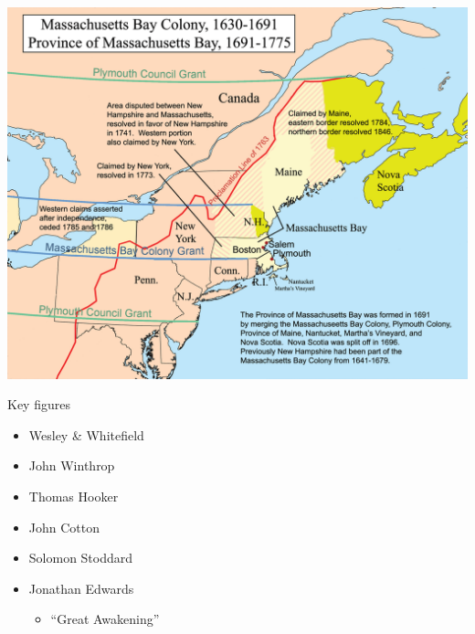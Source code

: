 \begin{frame}[label=sec-2-8]{}
\includegraphics[width=.9\linewidth]{./img/Masscolony.png}
\end{frame}

\begin{frame}[label=sec-2-9]{Key figures}
\begin{itemize}
\item Wesley \& Whitefield
\item John Winthrop
\item Thomas Hooker
\item John Cotton
\item Solomon Stoddard
\item Jonathan Edwards
\begin{itemize}
\item ``Great Awakening''
\end{itemize}
\end{itemize}
\end{frame}

